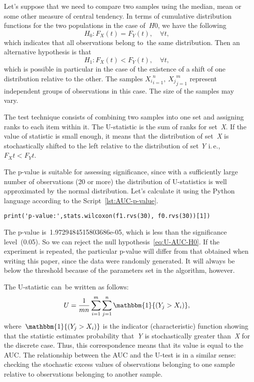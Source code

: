 \documentclass[]{scrreprt}
\begin{document}
Let's suppose that we need to compare two samples using the median, mean or some other measure of central tendency. In terms of cumulative distribution functions for the two populations in the case of~$H0$, we have the following
\begin{equation}\label{eq:U-AUC-H0}
H_0: F_{X}(t) = F_{Y}(t), \quad \forall t,
\end{equation}
which indicates that all observations belong to~the same distribution. Then an alternative hypothesis is that
\begin{equation}\label{eq:U-AUC-H1}
H_1: F_{X}(t) < F_{Y}(t), \quad \forall t,
\end{equation}
which is possible in particular in the case of the existence of a shift of one distribution relative to the other. The samples ${X_{i}}_{i=1}^{n},\ {X_{j}}_{j=1}^{m}$ represent independent groups of observations in this case. The size of the samples may vary.

The test technique consists of combining two samples into one set and assigning ranks to each item within it. The U-statistic is the sum of ranks for set~\textit{X}. If the value of statistic is small enough, it means that the distribution of set~\textit{X} is stochastically shifted to the left relative to the distribution of set \textit{Y} i.\,e.,~$F_{X}{t} < F_{Y}{t}$.

The p-value is suitable for assessing significance, since with a sufficiently large number of observations (20 or more) the distribution of U-statistics is well approximated by the normal distribution. Let's calculate it using the Python language according to the Script~\ref{lst:AUC-p-value}.
%
\begin{lstlisting}[float=htp, caption = Calculation of~the p-value for the test data, firstnumber=1, label= lst:AUC-p-value]
print('p-value:',stats.wilcoxon(f1.rvs(30), f0.rvs(30))[1])

\end{lstlisting}
The p-value is~1.9729484515803686e-05, which is less than the significance level~(0.05). So we can reject the null hypothesis~\ref{eq:U-AUC-H0}. If the experiment is repeated, the particular p-value will differ from that obtained when writing this paper, since the data were randomly generated. It will always be below the threshold because of the parameters set in the algorithm, however.

The U-statistic can~be written as follows:
\begin{equation}\label{eq:U-statistics}
U = \frac{1}{mn}\sum_{i=1}^{m}\sum_{j=1}^{n}\mathbbm{1}{(Y_{j}>X_{i})},
\end{equation}
where~$\mathbbm{1}{(Y_{j}>X_{i})}$ is the indicator (characteristic) function showing that the statistic  estimates probability that~\textit{Y} is stochastically greater than~\textit{X} for the discrete case. Thus, this correspondence means that its value is equal to the AUC. The relationship between the AUC and the U-test is in a similar sense: checking the stochastic excess values of observations belonging to one sample relative to observations belonging to another sample.
%
\end{document}
